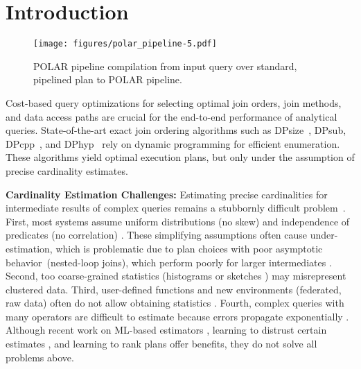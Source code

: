 \section{Introduction}
\label{sec:intro}

\begin{figure*}[t]
    \centering
    \texttt{[image: figures/polar\_pipeline-5.pdf]}
		\vspace{-0.4cm}
		\caption{POLAR pipeline compilation from input query over standard, pipelined plan to POLAR pipeline.}
    \label{fig:pipeline_design}
		\vspace{-0.12cm}
\end{figure*}

Cost-based query optimizations \cite{SelingerACLP79,moerkotte23} for selecting optimal join orders, join methods, and data access paths are crucial for the end-to-end performance of analytical queries. State-of-the-art exact join ordering algorithms such as DPsize~\cite{SelingerACLP79,HanKLLM08}, DPsub, DPcpp~\cite{MoerkotteN06}, and DPhyp~\cite{MoerkotteN08} rely on dynamic programming for efficient enumeration. These algorithms yield optimal execution plans, but only under the assumption of precise cardinality estimates.

\textbf{Cardinality Estimation Challenges:} Estimating precise cardinalities for intermediate results of complex queries remains a stubbornly difficult problem~\cite{LeisGMBK015}. First, most systems assume uniform distributions (no skew) and independence of predicates (no correlation) \cite{IlyasMHBA04}. These simplifying assumptions often cause under-estimation, which is problematic due to plan choices with poor asymptotic behavior~(\eg nested-loop joins), which perform poorly for larger intermediates \cite{IlyasMHBA04,LeisGMBK015}. Second, too coarse-grained statistics (\eg histograms \cite{KanneM10} or sketches \cite{IzenovDRS21}) may misrepresent clustered data. Third, user-defined functions and new environments (\eg federated, raw data) often do not allow obtaining statistics \cite{HueskePSRBKT12,JosifovskiSHL02,ReyFN23}. Fourth, complex queries with many operators are difficult to estimate because errors propagate exponentially \cite{IzenovDRS21,IoannidisC91,MoerkotteNS09}. Although recent work on ML-based estimators \cite{KipfKRLBK19,DuttWNKNC19,YangLKWDCAHKS19}, learning to distrust certain estimates \cite{MarcusNMZAKPT19}, and learning to rank plans \cite{BehrMK23} offer benefits, they do not solve all problems above.

